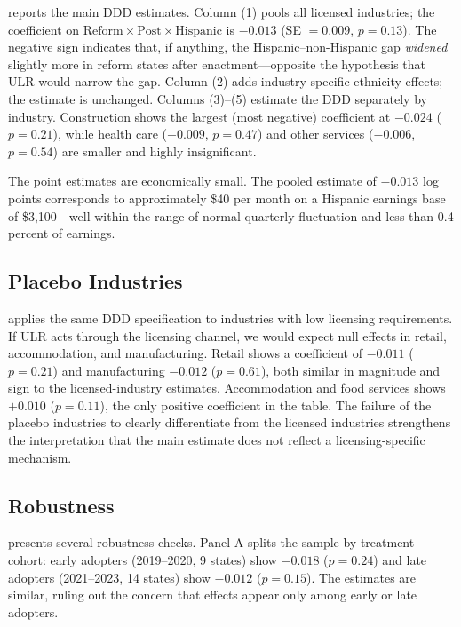 \documentclass[12pt]{article}
\begin{document}
 reports the main DDD estimates. Column (1) pools all licensed industries; the coefficient on $\text{Reform} \times \text{Post} \times \text{Hispanic}$ is $-0.013$ (SE $= 0.009$, $p = 0.13$). The negative sign indicates that, if anything, the Hispanic--non-Hispanic gap \textit{widened} slightly more in reform states after enactment---opposite the hypothesis that ULR would narrow the gap. Column (2) adds industry-specific ethnicity effects; the estimate is unchanged. Columns (3)--(5) estimate the DDD separately by industry. Construction shows the largest (most negative) coefficient at $-0.024$ ($p = 0.21$), while health care ($-0.009$, $p = 0.47$) and other services ($-0.006$, $p = 0.54$) are smaller and highly insignificant.

The point estimates are economically small. The pooled estimate of $-0.013$ log points corresponds to approximately \$40 per month on a Hispanic earnings base of \$3,100---well within the range of normal quarterly fluctuation and less than 0.4 percent of earnings.

\subsection{Placebo Industries}



 applies the same DDD specification to industries with low licensing requirements. If ULR acts through the licensing channel, we would expect null effects in retail, accommodation, and manufacturing. Retail shows a coefficient of $-0.011$ ($p = 0.21$) and manufacturing $-0.012$ ($p = 0.61$), both similar in magnitude and sign to the licensed-industry estimates. Accommodation and food services shows $+0.010$ ($p = 0.11$), the only positive coefficient in the table. The failure of the placebo industries to clearly differentiate from the licensed industries strengthens the interpretation that the main estimate does not reflect a licensing-specific mechanism.

\subsection{Robustness}



 presents several robustness checks. Panel A splits the sample by treatment cohort: early adopters (2019--2020, 9 states) show $-0.018$ ($p = 0.24$) and late adopters (2021--2023, 14 states) show $-0.012$ ($p = 0.15$). The estimates are similar, ruling out the concern that effects appear only among early or late adopters.
\end{document}
